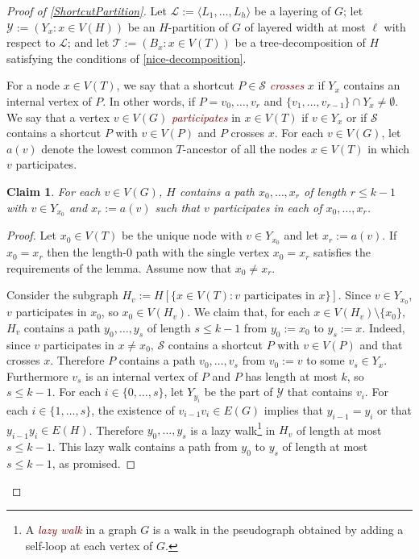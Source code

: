 \documentclass{patmorin}
\theoremstyle{plain}
\newtheorem{clm}{Claim}
\theoremstyle{definition}
\newcommand{\defin}[1]{\textcolor{Maroon}{\emph{#1}}}
\renewcommand{\SS}{\mathcal{S}}
\renewcommand{\le}{\leqslant}
\begin{document}
\begin{proof}[Proof of \cref{ShortcutPartition}]
  Let $\mathcal{L}:=\langle L_1,\ldots,L_h\rangle$ be a layering of $G$; let $\mathcal{Y}:=(Y_x: x\in V(H))$ be an $H$-partition of $G$ of layered width at most $\ell$ with respect to $\mathcal{L}$; and let $\mathcal{T}:=(B_x:x\in V(T))$ be a tree-decomposition of $H$ satisfying the conditions of \cref{nice-decomposition}.

For a node $x\in V(T)$, we say that a shortcut $P\in\SS$ \defin{crosses} $x$ if $Y_x$ contains an internal vertex of $P$.  In other words, if $P=v_0,\ldots,v_r$ and $\{v_1,\ldots,v_{r-1}\}\cap Y_x\neq\emptyset$.  We say that a vertex $v\in V(G)$ \defin{participates} in $x\in V(T)$ if $v\in Y_x$ or if $\SS$ contains a shortcut $P$ with $v\in V(P)$ and $P$ crosses $x$.  For each $v\in V(G)$, let $a(v)$ denote the lowest common $T$-ancestor of all the nodes $x\in V(T)$ in which $v$ participates.


\begin{clm}\label{short_path_in_h}
  For each $v\in V(G)$, $H$ contains a path $x_0,\ldots,x_r$ of length $r\le k-1$ with $v\in Y_{x_0}$ and $x_r:=a(v)$ such that $v$ participates in each of $x_0,\ldots,x_r$.
\end{clm}

\begin{proof}
  Let $x_0\in V(T)$ be the unique node with $v\in Y_{x_0}$ and let $x_r:=a(v)$.  If $x_0=x_r$ then the length-$0$ path with the single vertex $x_0=x_r$ satisfies the requirements of the lemma.  Assume now that $x_0\neq x_r$.

  Consider the subgraph $H_v:=H[\{x\in V(T):\text{$v$ participates in $x$}\}]$.  Since $v\in Y_{x_0}$, $v$ participates in $x_0$, so $x_0\in V(H_v)$.  We claim that, for each $x\in V(H_v)\setminus\{x_0\}$, $H_v$ contains a path $y_0,\ldots,y_s$ of length $s\le k-1$ from $y_0:=x_0$ to $y_s:=x$.  Indeed, since $v$ participates in $x\neq x_0$, $\mathcal{S}$ contains a shortcut $P$ with $v\in V(P)$ and that crosses $x$.  Therefore $P$ contains a path $v_0,\ldots,v_s$ from $v_0:=v$ to some $v_s\in Y_x$.   Furthermore $v_s$ is an internal vertex of $P$ and $P$ has length at most $k$, so $s\le k-1$.  For each $i\in\{0,\ldots,s\}$, let $Y_{y_i}$ be the part of $\mathcal{Y}$ that contains $v_i$.  For each $i\in\{1,\ldots,s\}$, the existence of $v_{i-1}v_{i}\in E(G)$ implies that $y_{i-1}=y_i$ or that $y_{i-1}y_i\in E(H)$.  Therefore $y_0,\ldots,y_s$ is a lazy walk\footnote{A \defin{lazy walk} in a graph $G$ is a walk in the pseudograph obtained by adding a self-loop at each vertex of $G$.} in $H_v$ of length at most $s\le k-1$.  This lazy walk contains a path from $y_0$ to $y_s$ of length at most $s\le k-1$, as promised.


\end{proof}
\end{proof}
\end{document}
